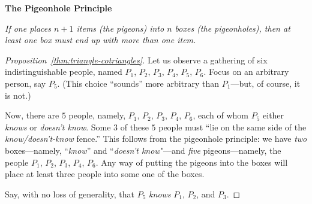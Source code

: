\bigskip


\noindent %
\hspace*{.1in}\begin{minipage}{0.95\textwidth}
{\bf The Pigeonhole Principle}

{\em If one places $n+1$ items (the pigeons) into $n$ boxes (the pigeonholes), then at least one box must end up with more than one item.}
\end{minipage} %

\bigskip

\begin{proof}[Proposition~\ref{thm:triangle-cotriangles}]
Let us observe a gathering of six indistinguishable people, named $P_1$, $P_2$, $P_3$, $P_4$, $P_5$, $P_6$.  Focus on an arbitrary person, say $P_5$.  (This choice ``sounds'' more arbitrary than $P_1$---but, of course, it is not.)

Now, there are $5$ people, namely, $P_1$, $P_2$, $P_3$, $P_4$, $P_6$, each of whom $P_5$ either {\em knows} or {\em doesn't know}.  Some $3$ of these $5$ people must ``lie on the same side of the {\em know/doesn't-know} fence.''  This follows from the pigeonhole principle: we have {\em two} boxes---namely, ``{\em know}'' and ``{\em doesn't know}"---and {\em five} pigeons---namely, the people $P_1$, $P_2$, $P_3$, $P_4$, $P_6$.  Any way of putting the pigeons into the boxes will place at least three people into some one of the boxes.

Say, with no loss of generality, that $P_5$ {\em knows} $P_1$, $P_2$, and $P_3$.

\medskip

\noindent {}
\end{proof}
